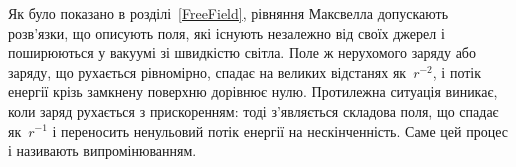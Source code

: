 %
%
%
%
%
%
%
%
%

Як було показано в розділі~\ref{FreeField}, рівняння Максвелла допускають розв'язки, що описують поля, які існують
незалежно від своїх джерел і поширюються у вакуумі зі швидкістю світла. Поле ж нерухомого заряду або заряду, що
рухається рівномірно, спадає на великих відстанях як~$r^{-2}$, і потік енергії крізь замкнену поверхню дорівнює
нулю. Протилежна ситуація виникає, коли заряд рухається з прискоренням: тоді з'являється складова поля, що спадає
як~$r^{-1}$ і переносить ненульовий потік енергії на нескінченність. Саме цей процес і називають випромінюванням.

